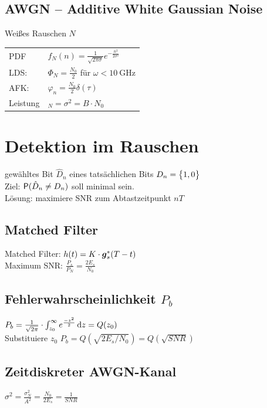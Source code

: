 \documentclass[fs, footer]{latex4ei}
\begin{document}
\begin{multicols*}{4}
\subsection{\textsc{AWGN} -- Additive White Gaussian Noise}
Weißes Rauschen $\textit{N}$\\
\begin{tabular}{ll}
PDF & $f_\textit{N}(n) = \frac{1}{\sqrt{2\pi \sigma}} e^{-\frac{n^2}{2\sigma^2}}$\\
LDS: & $\Phi_\textit{N} = \frac{N_0}{2}$ \qquad für $\omega < \SI{10}{\giga \hertz}$\\
AFK: & $\varphi_n = \frac{N_0}{2} \delta(\tau)$\\
Leistung & $_\textit{N} = \sigma^2 = B \cdot N_0$\\
\end{tabular}




\section{Detektion im Rauschen}
gewähltes Bit $\hat D_n$ eines tatsächlichen Bits $D_n = \eset{1,0}$\\
Ziel: $\P(\hat D_n \ne D_n)$ soll minimal sein.\\
Lösung: maximiere SNR zum Abtastzeitpunkt $nT$\\

	\subsection{Matched Filter}
Matched Filter: $h(t) = K \cdot \cxc g_s(T-t)$\\
Maximum SNR: $\frac{P_s}{P_N} = \frac{2E_s}{N_0}$\\

	\subsection{Fehlerwahrscheinlichkeit $P_b$}
	$P_b = \frac{1}{\sqrt{2 \pi}} \cdot \int_{z_0}^\infty e^{\frac{-z^2}{2}} \diff z = Q(z_0)$\\
	Substituiere $z_0$
	$P_b = Q(\sqrt{2 E_s / N_0}) = Q(\sqrt{SNR})$
	
	\subsection{Zeitdiskreter AWGN-Kanal}
	$\sigma^2 = \frac{\sigma_\textit{N}^2}{A^2} = \frac{N_0}{2 E_s} = \frac{1}{SNR}$\\
	

\end{multicols*}
\end{document}
